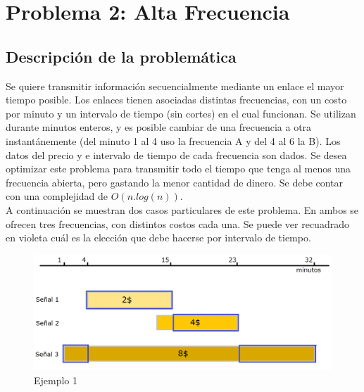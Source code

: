 \documentclass[a4paper]{article}
\begin{document}








\newpage

\section{Problema 2: Alta Frecuencia}
\subsection{Descripci\'on de la problem\'atica}

Se quiere transmitir informaci\'on secuencialmente mediante un enlace el mayor tiempo posible. Los enlaces tienen asociadas distintas frecuencias, con un costo por minuto y un intervalo de tiempo (sin cortes) en el cual funcionan. Se utilizan durante minutos enteros, y es posible cambiar de una frecuencia a otra instant\'anemente (del minuto 1 al 4 uso la frecuencia A y del 4 al 6 la B). Los datos del precio y e intervalo de tiempo de cada frecuencia son dados. Se desea optimizar este problema para transmitir todo el tiempo que tenga al menos una frecuencia abierta, pero gastando la menor cantidad de dinero. Se debe contar con una complejidad de $O(n.log(n))$.\\

A continuaci\'on se muestran dos casos particulares de este problema. En ambos se ofrecen tres frecuencias, con distintos costos cada una. Se puede ver recuadrado en violeta cu\'al es la elecci\'on que debe hacerse por intervalo de tiempo.


 \begin{figure}[h!]
   \begin{center}
 	\includegraphics[scale=0.45]{imagenes/ej2/ejemplo1.png}
 	\caption{Ejemplo 1}
   \end{center}
 \end{figure}
\end{document}
